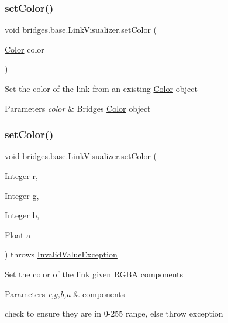 \subsubsection{\texorpdfstring{setColor()}{setColor()}\hspace{0.1cm}{\footnotesize\ttfamily [2/3]}}
{\footnotesize\ttfamily void bridges.\+base.\+Link\+Visualizer.\+set\+Color (\begin{DoxyParamCaption}\item[{\mbox{\hyperlink{classbridges_1_1base_1_1_color}{Color}}}]{color }\end{DoxyParamCaption})}

Set the color of the link from an existing \mbox{\hyperlink{classbridges_1_1base_1_1_color}{Color}} object 
\begin{DoxyParams}{Parameters}
{\em color} & Bridges \mbox{\hyperlink{classbridges_1_1base_1_1_color}{Color}} object \\
\hline
\end{DoxyParams}
\mbox{\label{classbridges_1_1base_1_1_link_visualizer_a003905cfe33e1704555b2b3a1cf99bad}} 
\subsubsection{\texorpdfstring{setColor()}{setColor()}\hspace{0.1cm}{\footnotesize\ttfamily [3/3]}}
{\footnotesize\ttfamily void bridges.\+base.\+Link\+Visualizer.\+set\+Color (\begin{DoxyParamCaption}\item[{Integer}]{r,  }\item[{Integer}]{g,  }\item[{Integer}]{b,  }\item[{Float}]{a }\end{DoxyParamCaption}) throws \mbox{\hyperlink{classbridges_1_1validation_1_1_invalid_value_exception}{Invalid\+Value\+Exception}}}

Set the color of the link given R\+G\+BA components


\begin{DoxyParams}{Parameters}
{\em r,g,b,a} & components\\
\hline
\end{DoxyParams}
check to ensure they are in 0-\/255 range, else throw exception \mbox{\label{classbridges_1_1base_1_1_link_visualizer_a073d84e04dd95c3848c9f4e0ad74eb77}} 
